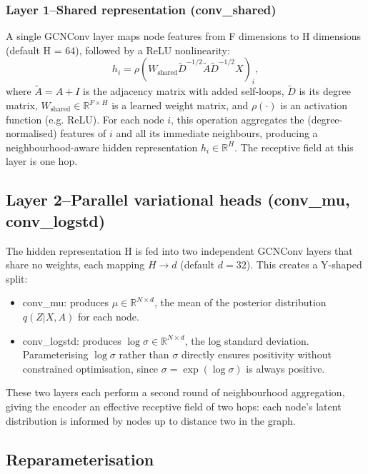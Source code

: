 \documentclass[11pt]{article}
\begin{document}
\subsubsection{Layer 1--Shared representation (conv\_shared)}
A single GCNConv layer maps node features from F dimensions to H
dimensions (default H = 64), followed by a ReLU nonlinearity:
\[ h_i  =  \rho( W_{\text{shared}} \tilde{D}^{-1/2} \tilde{A}
\tilde{D}^{-1/2} X )_i, \]
where $\tilde{A} = A + I$ is the adjacency matrix with added
self-loops, $\tilde{D}$ is its degree matrix, 
$W_{\text{shared}} \in \mathbb{R}^{F×H}$
is a learned weight matrix, and $\rho(\cdot)$ is an activation
function (e.g. ReLU).
For each node $i$, this operation aggregates
the (degree-normalised) features of $i$ and all its immediate
neighbours, producing a neighbourhood-aware hidden representation
$h_i \in \mathbb{R}^H$. The receptive field at this layer is one hop.


\subsection{Layer 2--Parallel variational heads (conv\_mu,
conv\_logstd)}

The hidden representation H is fed into two independent GCNConv layers
that share no weights, each mapping $H \to d$ (default $d = 32$). This
creates a Y-shaped split:
\begin{itemize}
\item conv\_mu: produces $\mu \in \mathbb{R}^{N \times d}$, the mean
of the posterior distribution $q(Z | X, A)$ for each node.

\item conv\_logstd: produces $\log \sigma \in \mathbb{R}^{N \times d}$,
the log standard deviation. Parameterising $\log \sigma$ rather than
$\sigma$ directly ensures positivity without constrained optimisation,
since $\sigma = \exp(\log \sigma)$ is always positive.
\end{itemize}

These two layers each perform a second round of neighbourhood
aggregation, giving the encoder an effective receptive field of two
hops: each node's latent distribution is informed by nodes up to
distance two in the graph.


\subsection{Reparameterisation}
\end{document}
